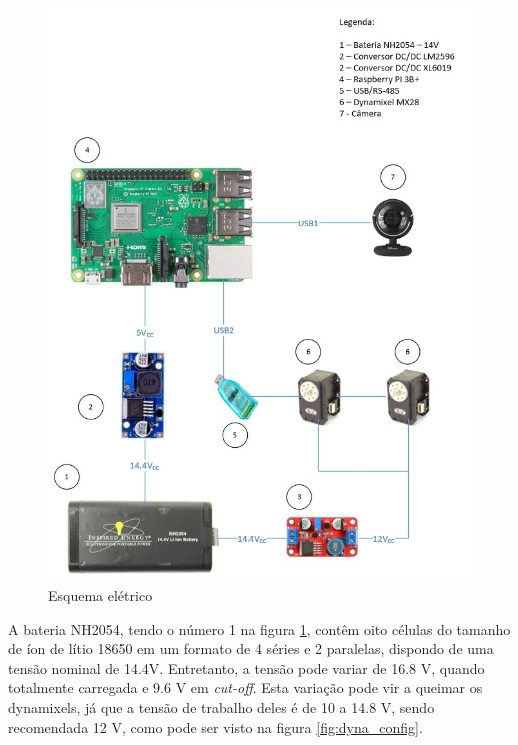 \begin{figure}[H]
	\centering
	\includegraphics[scale=0.6, angle=0]{Figures/diagrama.jpeg}
	\caption{Esquema elétrico}
	\label{fig:esq_ele}
\end{figure}

A bateria NH2054, tendo o número 1 na figura \ref{fig:esq_ele}, contêm oito células do tamanho de íon de lítio 18650 em um formato de 4 séries e 2 paralelas, dispondo de uma tensão nominal de 14.4V. Entretanto, a tensão pode variar de 16.8 V, quando totalmente carregada e 9.6 V em \textit{cut-off}. Esta variação pode vir a queimar os dynamixels, já que a tensão de trabalho deles é de 10 a 14.8 V, sendo recomendada 12 V, como pode ser visto na figura \ref{fig:dyna_config}.

